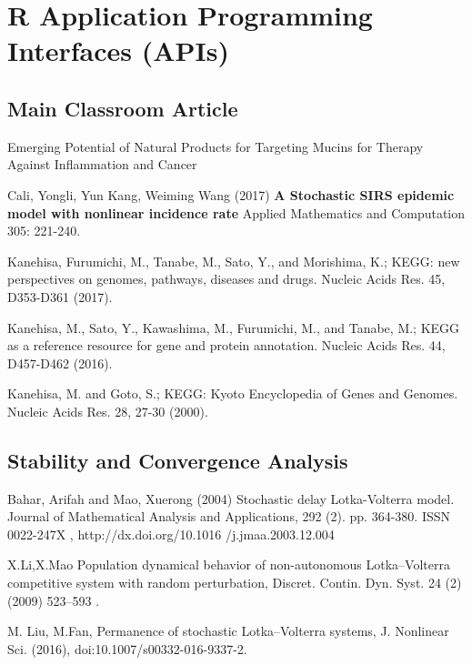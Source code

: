 \section{R Application Programming Interfaces (APIs)}




\begin{thebibliography}{00}

\subsection{Main Classroom Article}

Emerging Potential of Natural Products for Targeting Mucins for Therapy Against Inflammation and Cancer

Cali, Yongli, Yun Kang, Weiming Wang (2017)
\newblock \textbf{A Stochastic SIRS epidemic model with nonlinear incidence rate}
\newblock Applied Mathematics and Computation 305: 221-240.

 Kanehisa, Furumichi, M., Tanabe, M., Sato, Y., and Morishima, K.; 
\newblock KEGG: new perspectives on genomes, pathways, diseases and drugs. 
\newblock Nucleic Acids Res. 45, D353-D361 (2017).

 Kanehisa, M., Sato, Y., Kawashima, M., Furumichi, M., and Tanabe, M.; 
\newblock KEGG as a reference resource for gene and protein annotation. 
\newblock Nucleic Acids Res. 44, D457-D462 (2016).

 Kanehisa, M. and Goto, S.; 
\newblock KEGG: Kyoto Encyclopedia of Genes and Genomes. 
\newblock Nucleic Acids Res. 28, 27-30 (2000). 

\subsection{Stability and Convergence Analysis}

Bahar, Arifah and Mao, Xuerong (2004) 
\newblock Stochastic delay Lotka-Volterra model. 
\newblock Journal of Mathematical Analysis and Applications, 292 (2). pp. 364-380. ISSN 0022-247X , http://dx.doi.org/10.1016
/j.jmaa.2003.12.004

 X.Li,X.Mao
\newblock Population dynamical behavior of non-autonomous Lotka–Volterra competitive system with random perturbation, 
\newblock Discret. Contin. Dyn. Syst. 24 (2) (2009) 523–593 .

 M. Liu, M.Fan, 
\newblock Permanence of stochastic Lotka–Volterra systems,
\newblock J. Nonlinear Sci. (2016), doi:10.1007/s00332-016-9337-2.


\end{thebibliography}
